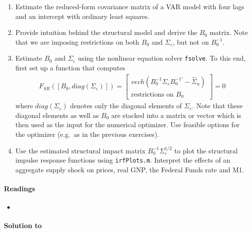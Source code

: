 \begin{enumerate}
\item Estimate the reduced-form covariance matrix of a VAR model with four lags and an intercept with ordinary least squares.

\item Provide intuition behind the structural model and derive the \(B_{0}\) matrix.
Note that we are imposing restrictions on both \(B_{0}\) and \(\Sigma_{\varepsilon} \), but not on \(B_{0}^{-1}\).

\item Estimate \(B_{0}\) and \(\Sigma_{\varepsilon}\) using the nonlinear equation solver \texttt{fsolve}.
To this end, first set up a function that computes
\begin{align*}
F_{SR}([B_{0}, diag(\Sigma_{\varepsilon})]) = \begin{bmatrix} vech\left(B_{0}^{-1} \Sigma_{\varepsilon} B_{0}^{-1'} - \hat{\Sigma}_u\right)\\\text{restrictions on }B_{0}\end{bmatrix}=0
\end{align*}
where \(diag(\Sigma_{\varepsilon})\) denotes only the diagonal elements of \(\Sigma_{\varepsilon}\).
Note that these diagonal elements as well as \(B_{0}\) are stacked into a matrix or vector which is then used as the input for the numerical optimizer.
Use feasible options for the optimizer (e.g.\ as in the previous exercises).

\item Use the estimated structural impact matrix \(B_{0}^{-1}\Sigma_{\varepsilon}^{1/2}\) to plot the structural impulse response functions using \texttt{irfPlots.m}.
Interpret the effects of an aggregate supply shock on prices, real GNP, the Federal Funds rate and M1.
\end{enumerate}

\paragraph{Readings}
\begin{itemize}
\item \textcite[Ch.~8-9]{Kilian.Lutkepohl_2017_StructuralVectorAutoregressive}
\end{itemize}

\begin{solution}\textbf{Solution to }
\ifDisplaySolutions%

\fi
\newpage
\end{solution}